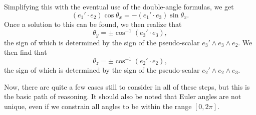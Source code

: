 \documentclass[12pt]{article}
\begin{document}
Simplifying this with the eventual use of the double-angle formulas, we get
\begin{equation*}
(e_1'\cdot e_2)\cos\theta_x = -(e_1'\cdot e_3)\sin\theta_x.
\end{equation*}
Once a solution to this can be found, we then realize that
\begin{equation*}
\theta_y = \pm\cos^{-1}(e_3'\cdot e_3),
\end{equation*}
the sign of which is determined by the sign of the pseudo-scalar $e_3'\wedge e_3\wedge e_2$.
We then find that
\begin{equation*}
\theta_z = \pm\cos^{-1}(e_2'\cdot e_2),
\end{equation*}
the sign of which is determined by the sign of the pseudo-scalar $e_2'\wedge e_2\wedge e_3$.

Now, there are quite a few cases still to consider in all of these steps, but this is the basic path of reasoning.
It should also be noted that Euler angles are not unique, even if we constrain all angles to be within
the range $[0,2\pi]$.
\end{document}
